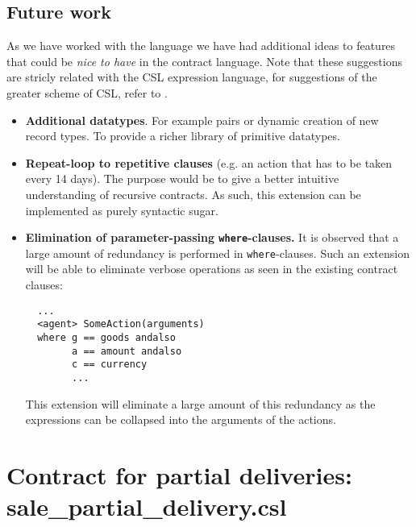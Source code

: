\documentclass[10pt,a4paper,final,oneside,openany,article]{memoir}
\begin{document}

\section{Future work}
As we have worked with the language we have had additional ideas to
features that could be \textit{nice to have} in the contract language.
Note that these suggestions are stricly related with the CSL expression
language, for suggestions of the greater scheme of CSL, refer to
\cite{hvitved10}.
\begin{itemize}
\item \textbf{Additional datatypes}. For example pairs or dynamic
  creation of new record types. To provide a richer library of primitive
  datatypes.
\item \textbf{Repeat-loop to repetitive clauses} (e.g. an action that
  has to be taken every 14 days). The purpose would be to give a better
  intuitive understanding of recursive contracts. As such, this
  extension can be implemented as purely syntactic sugar.
\item \textbf{Elimination of parameter-passing \lstinline{where}-clauses.} It is
  observed that a large amount of redundancy is performed in
  \lstinline{where}-clauses. Such an extension will be able to eliminate
  verbose operations as seen in the existing contract clauses:
  \begin{lstlisting}
  ...
  <agent> SomeAction(arguments)
  where g == goods andalso
        a == amount andalso
        c == currency
        ...
  \end{lstlisting}
  This extension will eliminate a large amount of this redundancy as
  the expressions can be collapsed into the arguments of the actions.
\end{itemize}

\printbibliography


\newpage
    \appendix
\chapter{Contract for partial deliveries: sale\_partial\_delivery.csl}
\label{chap:sale_partial_delivery}

\end{document}
